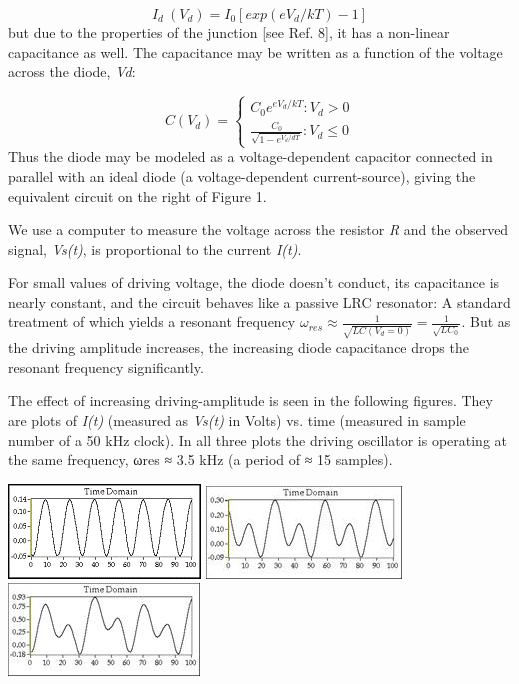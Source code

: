 \documentclass{../lab}
\begin{document}
\begin{equation}
    I_d~(V_d)=I_0[exp(eV_d / kT)-1]
\end{equation}
but due to the properties of the junction [see Ref. 8], it has a non-linear capacitance as well. The capacitance may be written as a function of the voltage across the diode, \emph{Vd}:

\begin{equation}
    C(V_d) = \begin{cases} C_0 e^{eV_d/kT}:V_d >0 \\ \frac{C_0}{\sqrt {1-e^{V_d/dT}}}:V_d\le 0 \end{cases}
\end{equation}
Thus the diode may be modeled as a voltage-dependent capacitor connected in parallel with an ideal diode (a voltage-dependent current-source), giving the equivalent circuit on the right of Figure 1.

We use a computer to measure the voltage across the resistor \emph{R} and the observed signal, \emph{Vs(t)}, is proportional to the current \emph{I(t)}.

For small values of driving voltage, the diode doesn't conduct, its capacitance is nearly constant, and the circuit behaves like a passive LRC resonator: A standard treatment of which yields a resonant frequency $  {\omega }_{res}\approx\frac{1}{\sqrt{LC( V_d=0)}}=\frac{1}{\sqrt{LC_0}} $. But as the driving amplitude increases, the increasing diode capacitance drops the resonant frequency significantly.

The effect of increasing driving-amplitude is seen in the following figures. They are plots of \emph{I(t)} (measured as \emph{Vs(t)} in Volts) vs. time (measured in sample number of a 50 kHz clock). In all three plots the driving oscillator is operating at the same frequency, ωres ≈ 3.5 kHz (a period of ≈ 15 samples).

\noindent
\href{http://experimentationlab.berkeley.edu/sites/default/files/images/Nldimage014.gif}{\includegraphics[width=0.33\linewidth,keepaspectratio]{images/Nldimage014.png}}
\href{http://experimentationlab.berkeley.edu/sites/default/files/images/Nldimage015.jpg}{\includegraphics[width=0.33\linewidth,keepaspectratio]{images/Nldimage015.jpg}}
\href{http://experimentationlab.berkeley.edu/sites/default/files/images/Nldimage016.jpg}{\includegraphics[width=0.33\linewidth,keepaspectratio]{images/Nldimage016.jpg}}
\end{document}
